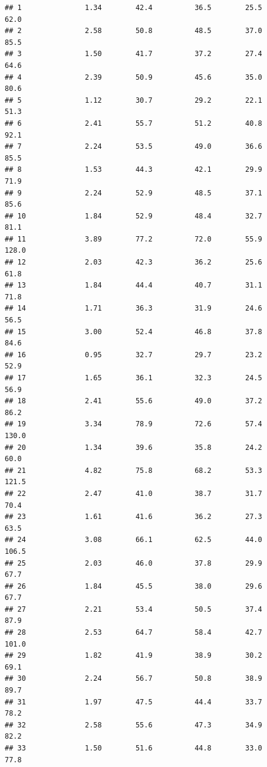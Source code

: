 \documentclass[
]{book}
\theoremstyle{definition}
\theoremstyle{definition}
\theoremstyle{definition}
\theoremstyle{definition}
\theoremstyle{remark}
\begin{document}
\begin{verbatim}
## 1               1.34        42.4          36.5        25.5             62.0
## 2               2.58        50.8          48.5        37.0             85.5
## 3               1.50        41.7          37.2        27.4             64.6
## 4               2.39        50.9          45.6        35.0             80.6
## 5               1.12        30.7          29.2        22.1             51.3
## 6               2.41        55.7          51.2        40.8             92.1
## 7               2.24        53.5          49.0        36.6             85.5
## 8               1.53        44.3          42.1        29.9             71.9
## 9               2.24        52.9          48.5        37.1             85.6
## 10              1.84        52.9          48.4        32.7             81.1
## 11              3.89        77.2          72.0        55.9            128.0
## 12              2.03        42.3          36.2        25.6             61.8
## 13              1.84        44.4          40.7        31.1             71.8
## 14              1.71        36.3          31.9        24.6             56.5
## 15              3.00        52.4          46.8        37.8             84.6
## 16              0.95        32.7          29.7        23.2             52.9
## 17              1.65        36.1          32.3        24.5             56.9
## 18              2.41        55.6          49.0        37.2             86.2
## 19              3.34        78.9          72.6        57.4            130.0
## 20              1.34        39.6          35.8        24.2             60.0
## 21              4.82        75.8          68.2        53.3            121.5
## 22              2.47        41.0          38.7        31.7             70.4
## 23              1.61        41.6          36.2        27.3             63.5
## 24              3.08        66.1          62.5        44.0            106.5
## 25              2.03        46.0          37.8        29.9             67.7
## 26              1.84        45.5          38.0        29.6             67.7
## 27              2.21        53.4          50.5        37.4             87.9
## 28              2.53        64.7          58.4        42.7            101.0
## 29              1.82        41.9          38.9        30.2             69.1
## 30              2.24        56.7          50.8        38.9             89.7
## 31              1.97        47.5          44.4        33.7             78.2
## 32              2.58        55.6          47.3        34.9             82.2
## 33              1.50        51.6          44.8        33.0             77.8

\end{verbatim}
\end{document}
